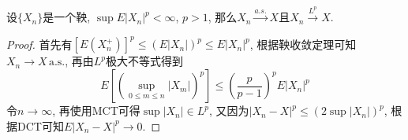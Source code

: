 \documentclass[cn, 12pt, math=mtpro2, bibstyle=apa, blue, twocol]{elegantbook}
\begin{document}
\begin{theorem}[$L^p$收敛定理]
  设$\{X_n\}$是一个鞅, $\sup E|X_n|^p<\infty$, $p>1$, 那么$X_n\xrightarrow{a.s.} X$且$X_n\xrightarrow{L^p}X$.
\end{theorem}
\begin{proof}
  首先有$[E(X_n^+)]^p\leq (E|X_n|)^p\leq E|X_n|^p$, 根据鞅收敛定理可知$X_n\to X\,\text{a.s.}$, 再由$L^p$极大不等式得到
  $$E\left[\left(\sup_{0\leq m\leq n}|X_m|\right)^p\right]\leq\left(\frac{p}{p-1}\right)^pE|X_n|^p$$
  令$n\to\infty$, 再使用MCT可得$\sup |X_n|\in L^p$, 又因为$|X_n-X|^p\leq (2\sup|X_n|)^p$, 根据DCT可知$E|X_n-X|^p\to0$.
\end{proof}
\end{document}
